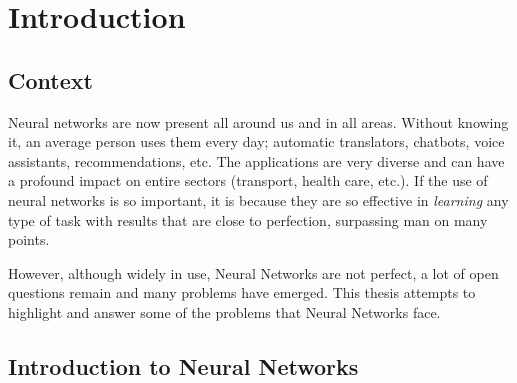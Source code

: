 \chapter{Introduction}
\label{chapter:introduction}
\localtableofcontents

\section{Context}

Neural networks are now present all around us and in all areas.
Without knowing it, an average person uses them every day; automatic translators, chatbots, voice assistants, recommendations, etc.
The applications are very diverse and can have a profound impact on entire sectors (transport, health care, etc.).
If the use of neural networks is so important, it is because they are so effective in \emph{learning} any type of task with results that are close to perfection, surpassing man on many points.

However, although widely in use, Neural Networks are not perfect, a lot of open questions remain and many problems have emerged.
This thesis attempts to highlight and answer some of the problems that Neural Networks face.

\section{Introduction to Neural Networks}

